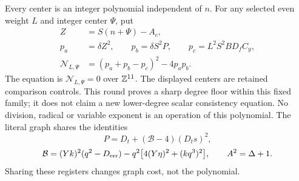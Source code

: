 Every center is an integer polynomial independent of $n$. For any selected even weight $L$ and integer center $\Psi$, put
\begin{align}
 Z&=S(n+\Psi)-A_c,\nonumber\\
 p_a&=\delta Z^2,\qquad p_b=\delta S^2P,
 \qquad p_c=L^2S^2BD_fC_y,\nonumber\\
 \mathcal N_{L,\Psi}&=(p_a+p_b-p_c)^2-4p_ap_b.
 \label{eq:scalarfinal}
\end{align}
The equation is $\mathcal N_{L,\Psi}=0$ over $\mathbb Z^{11}$.
The displayed centers are retained comparison controls. This round proves
a sharp degree floor within this fixed family; it does not claim a new
lower-degree scalar consistency equation. No division,
radical or variable exponent is an operation of this polynomial. The
literal graph shares the identities
\[
 P=D_t+(\mathcal B-4)(D_ts)^2,
\]
\[
 \mathcal B=(Yk)^2(q^2-D_{\rm err})
       -q^2\bigl[4(Y\eta)^2+(kq^3)^2\bigr],
 \qquad A^2=\Delta+1.
\]
Sharing these registers changes graph cost, not the polynomial.

